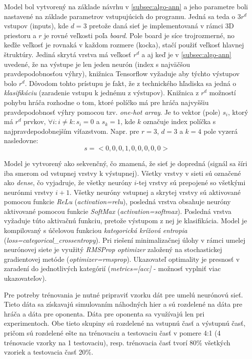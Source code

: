 Model bol vytvorený na základe návrhu v \autoref{subsec:algo-ann} a jeho parametre boli nastavené na základe
parametrov vstupujúcich do programu.
Jedná sa teda o $3r^d$ vstupov (inputs), kde $d=3$ pretože daná sieť je implementovaná v rámci 3D priestoru a $r$ je
rovné veľkosti poľa \emph{board}.
Pole board je síce trojrozmerné, no keďže veľkosť je rovnaká v každom rozmere (kocka), stačí použiť veľkosť hlavnej
štruktúry.
Jediná skrytá vrstva má veľkosť $r^d$ a aj keď je v \autoref{subsec:algo-ann} uvedené, že na výstupe je len
jeden neurón (index s najväčšou pravdepodobnosťou výhry), knižnica Tensorflow vyžaduje aby týchto výstupov bolo $r^d$.
Dôvodom tohto prístupu je fakt, že z technického hľadiska sa jedná o \emph{klasifikáciu} (zaradenie vstupu k jednému z
výstupov).
Knižnica z $r^d$ možností pohybu hráča rozhodne o tom, ktoré políčko má pre hráča najvyššiu pravdepodobnosť výhry
pomocou tzv. \emph{one-hot array}.
Je to vektor (pole) $s_i$, ktorý má $r^d$ prvkov, $\forall i : i\neq k : s_i=0$ a $s_k=1$, kde $k$ označuje index
políčka s najpravdepodobnejším víťazstvom.
Napr. pre $r=3$, $d=3$ a $k=4$ pole vyzerá nasledovne:
\begin{equation}
    s = <0, 0, 0, 1, 0, 0, 0, 0, 0>
\end{equation}

Model je vytvorený ako sekvenčný, čo znamená, že sieť je dopredná (signál sa šíri iba smerom od vstupnej vrstvy k
výstupnej).
Všetky vrstvy v sieti sú označené ako \emph{dense}, čo vyjadruje, že všetky neuróny $i$-tej vrstvy sú prepojené so
všetkými neurónmi vrstvy $i+1$.
Všetky neuróny vstupnej a skrytej vrstvy sú aktivované pomocou funkcie \emph{ReLu} (\emph{activation=relu}), posledná
vrstva obsahuje neuróny aktivované pomocou funkcie \emph{SoftMax} (\emph{activation=softmax}).
Posledná vrstva vyžaduje túto aktivačnú funkciu, pretože výstupom z nej je klasifikácia.
Model je kompilovaný s účelovou funkciou \emph{kategorická krížová entropia} (\emph{loss=categorical\_crossentropy}).
Pri riešení minimalizačnej úlohy v rámci umelej neurónovej siete je využitý \emph{RMSProp optimizer} založený na
stochastickej gradientovej metóde (\emph{optimizer=rmsprop}).
Ukazovateľ optimality je presnosť v zaradení do jednotlivých kategórií (\emph{metrics=[acc]} - možnosť vyplniť viac
ukazovateľov).

Pre potreby trénovania je nutné pripraviť vzorku dát pre umelú neurónovú sieť.
Tieto dáta sa získavajú simulovaním náhodných hier a sú rozdelené na dáta pre hráča a dáta pre oponenta.
Dáta pre oponenta sa využívajú len pri experimentoch.
Obe tieto skupiny sú rozdelené na vstupnú časť a výstupnú časť, pričom sú rozdelené ešte na trénovaciu a testovaciu časť
v pomere 4:1 (4 trénovacie vzorky na 1 testovaciu), resp. trénovacia časť tvorí 80\% všetkých vzoriek a testovacia časť
20\%.

